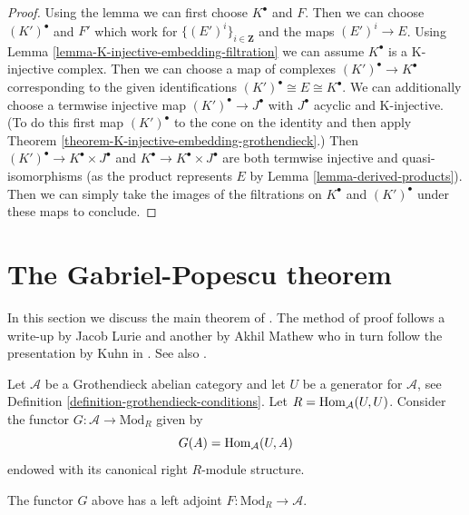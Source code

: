 \begin{proof}
Using the lemma we can first choose $K^\bullet$ and $F$.
Then we can choose $(K')^\bullet$ and $F'$ which work for
$\{(E')^i\}_{i \in \mathbf{Z}}$ and the maps $(E')^i \to E$.
Using Lemma \ref{lemma-K-injective-embedding-filtration}
we can assume $K^\bullet$ is a K-injective complex.
Then we can choose a map of complexes
$(K')^\bullet \to K^\bullet$ corresponding to
the given identifications
$(K')^\bullet \cong E \cong K^\bullet$.
We can additionally choose a termwise injective
map $(K')^\bullet \to J^\bullet$ with
$J^\bullet$ acyclic and K-injective.
(To do this first map $(K')^\bullet$ to the cone on the identity
and then apply Theorem \ref{theorem-K-injective-embedding-grothendieck}.)
Then $(K')^\bullet \to K^\bullet \times J^\bullet$ and
$K^\bullet \to K^\bullet \times J^\bullet$
are both termwise injective and quasi-isomorphisms
(as the product represents $E$ by Lemma \ref{lemma-derived-products}).
Then we can simply take the images of the filtrations
on $K^\bullet$ and $(K')^\bullet$ under these maps to conclude.
\end{proof}





\section{The Gabriel-Popescu theorem}
\label{section-gabriel-popescu}

\noindent
In this section we discuss the main theorem of \cite{GP}. The method of
proof follows a write-up by Jacob Lurie and another by Akhil Mathew
who in turn follow the presentation by Kuhn in \cite{Kuhn}.
See also \cite{Takeuchi}.

\medskip\noindent
Let $\mathcal{A}$ be a Grothendieck abelian category and let $U$ be a
generator for $\mathcal{A}$, see
Definition \ref{definition-grothendieck-conditions}.
Let $R = \mathop{\mathrm{Hom}}\nolimits_\mathcal{A}(U, U)$. Consider the functor
$G : \mathcal{A} \to \text{Mod}_R$ given by
$$
G(A) = \mathop{\mathrm{Hom}}\nolimits_\mathcal{A}(U, A)
$$
endowed with its canonical right $R$-module structure.

\begin{lemma}
\label{lemma-gabriel-popescu-left-adjoint}
The functor $G$ above has a left adjoint
$F : \text{Mod}_R \to \mathcal{A}$.
\end{lemma}


